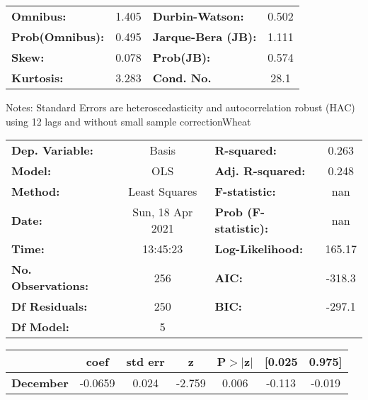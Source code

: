 \begin{center}
\begin{tabular}{lcccccc}
\bottomrule
\end{tabular}
\begin{tabular}{lclc}
\textbf{Omnibus:}       &  1.405 & \textbf{  Durbin-Watson:     } &    0.502  \\
\textbf{Prob(Omnibus):} &  0.495 & \textbf{  Jarque-Bera (JB):  } &    1.111  \\
\textbf{Skew:}          &  0.078 & \textbf{  Prob(JB):          } &    0.574  \\
\textbf{Kurtosis:}      &  3.283 & \textbf{  Cond. No.          } &     28.1  \\
\bottomrule
\end{tabular}
\end{center}

Notes: \newline
 [1] Standard Errors are heteroscedasticity and autocorrelation robust (HAC) using 12 lags and without small sample correctionWheat\begin{center}
\begin{tabular}{lclc}
\toprule
\textbf{Dep. Variable:}    &      Basis       & \textbf{  R-squared:         } &     0.263   \\
\textbf{Model:}            &       OLS        & \textbf{  Adj. R-squared:    } &     0.248   \\
\textbf{Method:}           &  Least Squares   & \textbf{  F-statistic:       } &       nan   \\
\textbf{Date:}             & Sun, 18 Apr 2021 & \textbf{  Prob (F-statistic):} &      nan    \\
\textbf{Time:}             &     13:45:23     & \textbf{  Log-Likelihood:    } &    165.17   \\
\textbf{No. Observations:} &         256      & \textbf{  AIC:               } &    -318.3   \\
\textbf{Df Residuals:}     &         250      & \textbf{  BIC:               } &    -297.1   \\
\textbf{Df Model:}         &           5      & \textbf{                     } &             \\
\bottomrule
\end{tabular}
\begin{tabular}{lcccccc}
                   & \textbf{coef} & \textbf{std err} & \textbf{z} & \textbf{P$> |$z$|$} & \textbf{[0.025} & \textbf{0.975]}  \\
\midrule
\textbf{December}  &      -0.0659  &        0.024     &    -2.759  &         0.006        &       -0.113    &       -0.019     \\

\end{tabular}
\end{center}
